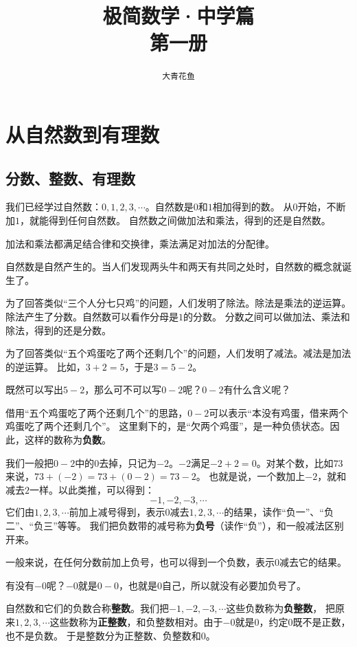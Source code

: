 \documentclass[12pt,UTF8]{ctexbook}
\title{\zihao{0} \bfseries 极简数学·中学篇 \\ 第一册}
\author{\zihao{2} \texttt{大青花鱼}}
\date{}
\begin{document}
\maketitle
\tableofcontents
\newpage

\chapter{从自然数到有理数}

\section{分数、整数、有理数}
我们已经学过自然数：$0,1,2,3,\cdots$。自然数是$0$和$1$相加得到的数。
从$0$开始，不断加$1$，就能得到任何自然数。
自然数之间做加法和乘法，得到的还是自然数。

加法和乘法都满足结合律和交换律，乘法满足对加法的分配律。

自然数是自然产生的。当人们发现两头牛和两天有共同之处时，自然数的概念就诞生了。

为了回答类似“三个人分七只鸡”的问题，人们发明了除法。除法是乘法的逆运算。除法产生了分数。自然数可以看作分母是$1$的分数。
分数之间可以做加法、乘法和除法，得到的还是分数。

为了回答类似“五个鸡蛋吃了两个还剩几个”的问题，人们发明了减法。减法是加法的逆运算。
比如，$3+2=5$，于是$3=5 - 2$。

既然可以写出$5-2$，那么可不可以写$0-2$呢？$0-2$有什么含义呢？

借用“五个鸡蛋吃了两个还剩几个”的思路，$0-2$可以表示“本没有鸡蛋，借来两个鸡蛋吃了两个还剩几个”。
这里剩下的，是“欠两个鸡蛋”，是一种负债状态。因此，这样的数称为\textbf{负数}。

我们一般把$0-2$中的$0$去掉，只记为$-2$。$-2$满足$-2+2=0$。对某个数，比如$73$来说，$73+(-2)=73+(0-2)=73-2$。
也就是说，一个数加上$-2$，就和减去$2$一样。以此类推，可以得到：
$$ -1, -2, -3, \cdots $$
它们由$1,2,3,\cdots$前加上减号得到，表示$0$减去$1,2,3,\cdots$的结果，读作“负一”、“负二”、“负三”等等。
我们把负数带的减号称为\textbf{负号}（读作“负”），和一般减法区别开来。

一般来说，在任何分数前加上负号，也可以得到一个负数，表示$0$减去它的结果。

有没有$-0$呢？$-0$就是$0-0$，也就是$0$自己，所以就没有必要加负号了。

自然数和它们的负数合称\textbf{整数}。我们把$-1, -2, -3, \cdots$这些负数称为\textbf{负整数}，
把原来$1,2,3,\cdots$这些数称为\textbf{正整数}，和负整数相对。由于$-0$就是$0$，约定$0$既不是正数，也不是负数。
于是整数分为正整数、负整数和$0$。
\end{document}
